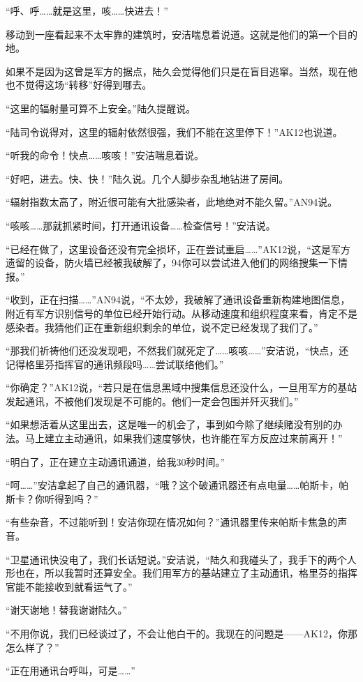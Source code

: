 “呼、呼……就是这里，咳……快进去！”

移动到一座看起来不太牢靠的建筑时，安洁喘息着说道。这就是他们的第一个目的地。

如果不是因为这曾是军方的据点，陆久会觉得他们只是在盲目逃窜。当然，现在他也不觉得这场“转移”好得到哪去。

“这里的辐射量可算不上安全。”陆久提醒说。

“陆司令说得对，这里的辐射依然很强，我们不能在这里停下！”AK12也说道。

“听我的命令！快点……咳咳！”安洁喘息着说。

“好吧，进去。快、快！”陆久说。几个人脚步杂乱地钻进了房间。

“辐射指数太高了，附近很可能有大批感染者，此地绝对不能久留。”AN94说。

“咳咳……那就抓紧时间，打开通讯设备……检查信号！”安洁说。

“已经在做了，这里设备还没有完全损坏，正在尝试重启……”AK12说，“这是军方遗留的设备，防火墙已经被我破解了，94你可以尝试进入他们的网络搜集一下情报。”

“收到，正在扫描……”AN94说，“不太妙，我破解了通讯设备重新构建地图信息，附近有军方识别信号的单位已经开始行动。从移动速度和组织程度来看，肯定不是感染者。我猜他们正在重新组织剩余的单位，说不定已经发现了我们了。”

“那我们祈祷他们还没发现吧，不然我们就死定了……咳咳……”安洁说，“快点，还记得格里芬指挥官的通讯频段吗……尝试联络他们。”

“你确定？”AK12说，“若只是在信息黑域中搜集信息还没什么，一旦用军方的基站发起通讯，不被他们发现是不可能的。他们一定会包围并歼灭我们。”

“如果想活着从这里出去，这是唯一的机会了，事到如今除了继续赌没有别的办法。马上建立主动通讯，如果我们速度够快，也许能在军方反应过来前离开！”

“明白了，正在建立主动通讯通道，给我30秒时间。”

“呵……”安洁拿起了自己的通讯器，“哦？这个破通讯器还有点电量……帕斯卡，帕斯卡？你听得到吗？”

“有些杂音，不过能听到！安洁你现在情况如何？”通讯器里传来帕斯卡焦急的声音。

“卫星通讯快没电了，我们长话短说。”安洁说，“陆久和我碰头了，我手下的两个人形也在，所以我暂时还算安全。我们用军方的基站建立了主动通讯，格里芬的指挥官能不能接收到就看运气了。”

“谢天谢地！替我谢谢陆久。”

“不用你说，我们已经谈过了，不会让他白干的。我现在的问题是——AK12，你那怎么样了？”

“正在用通讯台呼叫，可是……”

